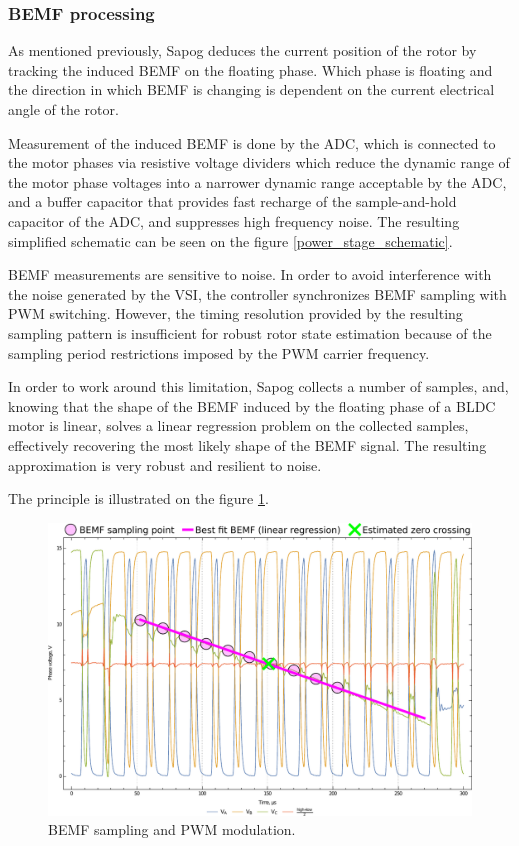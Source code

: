 \documentclass{zubaxdoc}
\begin{document}
\subsubsection{BEMF processing}

As mentioned previously, Sapog deduces the current position of the rotor by tracking the induced BEMF
on the floating phase.
Which phase is floating and the direction in which BEMF is changing is dependent on the current electrical
angle of the rotor.

Measurement of the induced BEMF is done by the ADC, which is connected to the motor phases via
resistive voltage dividers which reduce the dynamic range of the motor phase voltages into a narrower
dynamic range acceptable by the ADC,
and a buffer capacitor that provides fast recharge of the sample-and-hold capacitor of the ADC,
and suppresses high frequency noise.
The resulting simplified schematic can be seen on the figure \ref{power_stage_schematic}.

BEMF measurements are sensitive to noise. In order to avoid interference with the noise generated
by the VSI, the controller synchronizes BEMF sampling with PWM switching.
However, the timing resolution provided by the resulting sampling pattern is insufficient for robust
rotor state estimation because of the sampling period restrictions imposed by the
PWM carrier frequency.

In order to work around this limitation, Sapog collects a number of samples, and,
knowing that the shape of the BEMF induced by the floating phase of a BLDC motor is linear,
solves a linear regression problem on the collected samples, effectively recovering the most likely
shape of the BEMF signal.
The resulting approximation is very robust and resilient to noise.

The principle is illustrated on the figure \ref{phase_voltage_sampling}.

\begin{figure}[hbtp]
    \centering
	\includegraphics[width=\textwidth]{phase_voltage_sampling}
	\caption{BEMF sampling and PWM modulation.
	\label{phase_voltage_sampling}}
\end{figure}
\end{document}
